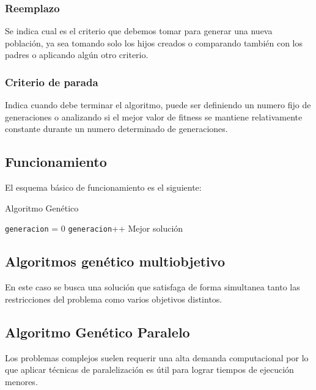 \subsubsection{Reemplazo} 
Se indica cual es el criterio que debemos tomar para generar una nueva población, ya sea tomando solo los hijos creados o comparando también con los padres o aplicando algún otro criterio.

\subsubsection{Criterio de parada} 
Indica cuando debe terminar el algoritmo, puede ser definiendo un numero fijo de generaciones o analizando si el mejor valor de fitness se mantiene relativamente constante durante un numero determinado de generaciones.

\subsection{Funcionamiento}

El esquema básico de funcionamiento es el siguiente:


\begin{algorithm}%
	\caption{Algoritmo Genético}
	\label{alg:algoritmo_genetico_simple}
	\begin{algorithmic} [1] 
		{
			\STATE \texttt{generacion} = 0
			\STATE \texttt{generacion}++
			\ENDWHILE
			\RETURN Mejor solución
		}
	\end{algorithmic}
\end{algorithm}




\subsection{Algoritmos genético multiobjetivo}

En este caso se busca una solución que satisfaga de forma simultanea tanto las restricciones del problema como varios objetivos distintos.



\subsection{Algoritmo Genético Paralelo}
Los problemas complejos suelen requerir una alta demanda computacional por lo que aplicar técnicas de paralelización es útil para lograr tiempos de ejecución menores.

